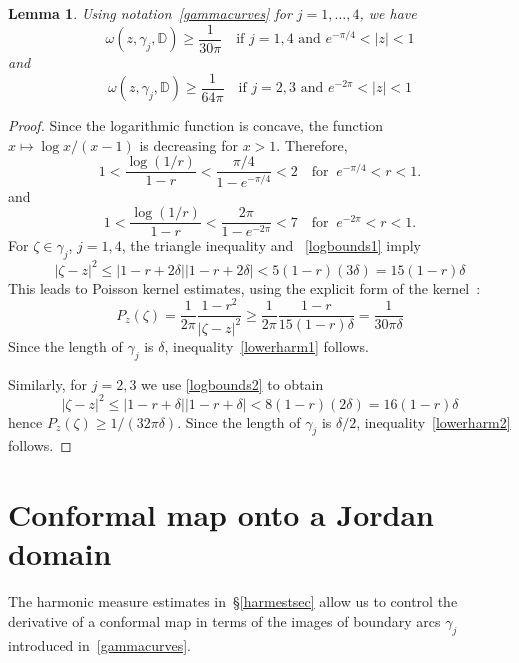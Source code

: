 \documentclass[11pt]{amsart}
\newtheorem{lemma}[theorem]{Lemma}
\theoremstyle{remark}
\numberwithin{equation}{section}
\newcommand{\DD}{\mathbb{D}}
\newcommand{\abs}[1]{\lvert#1\rvert}
\begin{document}
\begin{lemma}\label{lowerharm} Using notation~\eqref{gammacurves} for $j=1,\dots,4$, we have
\begin{equation}\label{lowerharm1}
\omega(z, \gamma_j, \DD) \ge \frac{1}{30\pi} \quad \text{if $j=1,4$ and $e^{-\pi/4}<|z|<1$}
\end{equation}
and
\begin{equation}\label{lowerharm2}
\omega(z, \gamma_j, \DD) \ge \frac{1}{64\pi} \quad \text{if $j=2,3$ and $e^{-2\pi}<|z|<1$}
\end{equation}
\end{lemma}
\begin{proof} Since the logarithmic function is concave, the function $x\mapsto \log x/(x-1)$ is decreasing for $x>1$. Therefore, 
\begin{equation}\label{logbounds1}
1 < \frac{\log(1/r)}{1-r} < \frac{\pi/4}{1-e^{-\pi/4}} < 2  \quad \text{for }\ e^{-\pi/4} < r< 1.
\end{equation}
and 
\begin{equation}\label{logbounds2}
1 < \frac{\log(1/r)}{1-r} < \frac{2\pi}{1-e^{-2\pi}} < 7  \quad \text{for }\ e^{-2\pi} < r< 1.
\end{equation}
For $\zeta\in \gamma_j$, $j=1,4$, the triangle inequality and ~\eqref{logbounds1} imply
\[
\abs{\zeta-z}^2 \le |1-r+2\delta| |1-r+2\delta| < 5 (1-r) (3\delta) = 15(1-r)\delta  
\]
This leads to Poisson kernel estimates, using the explicit form of the kernel~\cite[Theorem I.1.3]{GMb}:
\[
P_z(\zeta) = \frac{1}{2\pi}\frac{1-r^2}{\abs{\zeta-z}^2} 
\ge \frac{1}{2\pi}\frac{1-r}{15(1-r)\delta} = \frac{1}{30\pi \delta}
\]
Since the length of $\gamma_j$ is $\delta$, inequality~\eqref{lowerharm1} follows.

Similarly, for $j=2,3$ we use \eqref{logbounds2} to obtain 
\[
\abs{\zeta-z}^2 \le |1-r+\delta| |1-r+\delta| < 8 (1-r) (2\delta) = 16(1-r)\delta  
\]
hence $P_z(\zeta) \ge 1/(32\pi \delta)$. Since the length of  $\gamma_j$ is $\delta/2$, inequality~\eqref{lowerharm2} follows.
\end{proof}



\section{Conformal map onto a Jordan domain}\label{confJordansec}
 
The harmonic measure estimates  in~\S\ref{harmestsec} allow us to control the derivative of a conformal map in terms of the images of boundary arcs $\gamma_j$ introduced in~\eqref{gammacurves}.
 
\end{document}
